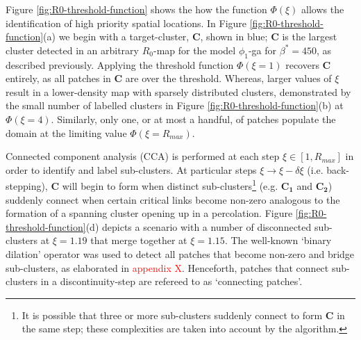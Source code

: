 Figure \ref{fig:R0-threshold-function} shows the how the function $\Phi(\xi)$ allows the identification of high priority spatial locations.
In Figure \ref{fig:R0-threshold-function}(a) we begin with a target-cluster, $\mathbf{C}$, shown in blue;
$\mathbf{C}$ is the largest cluster detected in an arbitrary $R_0$-map for the model $\phi_1$-ga for $\beta^*=450$, as described previously.
Applying the threshold function $\Phi(\xi=1)$ recovers $\mathbf{C}$ entirely, as all patches in $\mathbf{C}$ are over the threshold.
Whereas, larger values of $\xi$ result in a lower-density map with sparsely distributed clusters, 
demonstrated by the small number of labelled clusters in Figure \ref{fig:R0-threshold-function}(b) at $\Phi(\xi=4)$.
Similarly, only one, or at most a handful, of patches populate the domain at the limiting value $\Phi(\xi=R_{max})$.

Connected component analysis (CCA) is performed at each step $\xi \in [1, R_{max}]$ in order to identify and label sub-clusters. 
At particular steps $\xi \rightarrow \xi - \delta\xi$ (i.e. back-stepping), $\mathbf{C}$ will begin to form when distinct sub-clusters\footnote{
It is possible that three or more sub-clusters suddenly connect to form $\mathbf{C}$ in the same step; 
these complexities are taken into account by the algorithm.} 
 (e.g. $\mathbf{C_1}$ and $\mathbf{C_2}$) suddenly connect when certain critical links become non-zero\textemdash
analogous to the formation of a spanning cluster opening up in a percolation. 
Figure \ref{fig:R0-threshold-function}(d) depicts a scenario with a number of disconnected sub-clusters at $\xi=1.19$ that merge together at $\xi=1.15$.
The well-known `binary dilation' operator \cite{liang1989erosion, 23111, nachtegael2001connections} was used to detect all patches that become non-zero and bridge sub-clusters, as elaborated in \textcolor{red}{appendix X}.
Henceforth, patches that connect sub-clusters in a discontinuity-step are refereed to as `connecting patches'.

